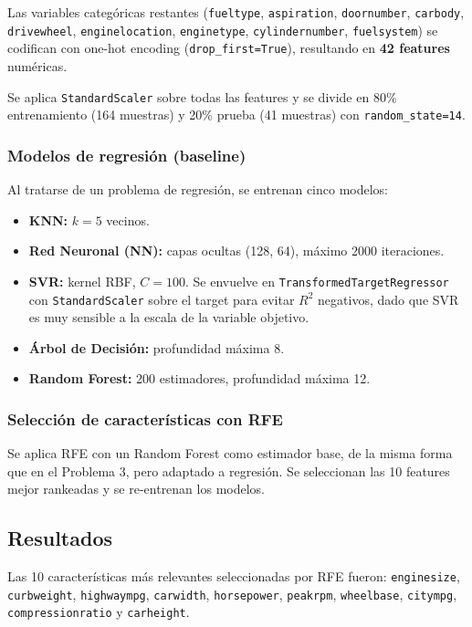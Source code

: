 \documentclass{article}
\begin{document}
Las variables categóricas restantes (\texttt{fueltype}, \texttt{aspiration}, \texttt{doornumber}, \texttt{carbody}, \texttt{drivewheel}, \texttt{enginelocation}, \texttt{enginetype}, \texttt{cylindernumber}, \texttt{fuelsystem}) se codifican con one-hot encoding (\texttt{drop\_first=True}), resultando en \textbf{42 features} numéricas.

Se aplica \texttt{StandardScaler} sobre todas las features y se divide en 80\% entrenamiento (164 muestras) y 20\% prueba (41 muestras) con \texttt{random\_state=14}.

\subsubsection{Modelos de regresión (baseline)}

Al tratarse de un problema de regresión, se entrenan cinco modelos:

\begin{itemize}
    \item \textbf{KNN:} $k=5$ vecinos.
    \item \textbf{Red Neuronal (NN):} capas ocultas (128, 64), máximo 2000 iteraciones.
    \item \textbf{SVR:} kernel RBF, $C=100$. Se envuelve en \texttt{TransformedTargetRegressor} con \texttt{StandardScaler} sobre el target para evitar $R^2$ negativos, dado que SVR es muy sensible a la escala de la variable objetivo.
    \item \textbf{Árbol de Decisión:} profundidad máxima 8.
    \item \textbf{Random Forest:} 200 estimadores, profundidad máxima 12.
\end{itemize}

\subsubsection{Selección de características con RFE}

Se aplica RFE con un Random Forest como estimador base, de la misma forma que en el Problema 3, pero adaptado a regresión. Se seleccionan las 10 features mejor rankeadas y se re-entrenan los modelos.

\subsection{Resultados}

Las 10 características más relevantes seleccionadas por RFE fueron: \texttt{enginesize}, \texttt{curbweight}, \texttt{highwaympg}, \texttt{carwidth}, \texttt{horsepower}, \texttt{peakrpm}, \texttt{wheelbase}, \texttt{citympg}, \texttt{compressionratio} y \texttt{carheight}.
\end{document}
